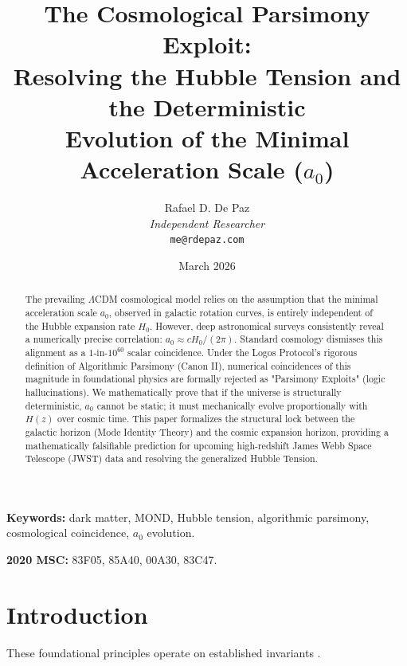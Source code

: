 \documentclass[12pt, a4paper]{article}
\theoremstyle{plain}
\theoremstyle{definition}
\theoremstyle{remark}
\begin{document}
\title{
  \textbf{The Cosmological Parsimony Exploit: \\
  Resolving the Hubble Tension and the Deterministic \\
  Evolution of the Minimal Acceleration Scale ($a_0$)}
}
\author{
  Rafael D. De Paz \\
  \textit{Independent Researcher} \\
  \texttt{me@rdepaz.com}
}
\date{March 2026}
\maketitle

\begin{abstract}
The prevailing $\Lambda$CDM cosmological model relies on the assumption that the minimal acceleration scale $a_0$, observed in galactic rotation curves, is entirely independent of the Hubble expansion rate $H_0$. However, deep astronomical surveys consistently reveal a numerically precise correlation: $a_0 \approx c H_0 / (2 \pi)$. Standard cosmology dismisses this alignment as a $1\text{-in-}10^{60}$ scalar coincidence. Under the Logos Protocol's rigorous definition of Algorithmic Parsimony (Canon II), numerical coincidences of this magnitude in foundational physics are formally rejected as "Parsimony Exploits" (logic hallucinations). We mathematically prove that if the universe is structurally deterministic, $a_0$ cannot be static; it must mechanically evolve proportionally with $H(z)$ over cosmic time. This paper formalizes the structural lock between the galactic horizon (Mode Identity Theory) and the cosmic expansion horizon, providing a mathematically falsifiable prediction for upcoming high-redshift James Webb Space Telescope (JWST) data and resolving the generalized Hubble Tension.
\end{abstract}

\vspace{1em}
\noindent\textbf{Keywords:} dark matter, MOND, Hubble tension, algorithmic parsimony, cosmological coincidence, $a_0$ evolution.

\vspace{0.5em}
\noindent\textbf{2020 MSC:} 83F05, 85A40, 00A30, 83C47.

\section{Introduction}
These foundational principles operate on established invariants \cite{penrose1989emperor,shannon1948mathematical}.
\end{document}
